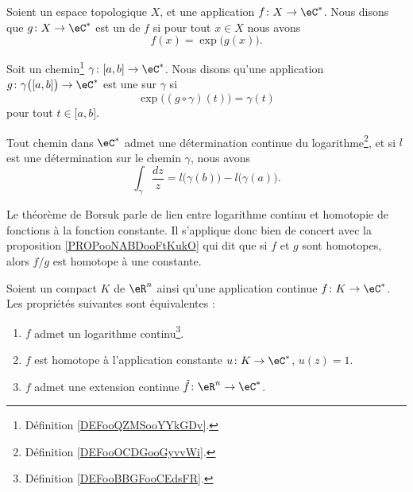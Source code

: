 \begin{definition}      \label{DEFooBBGFooCEdsFR}
	Soient un espace topologique \( X\), et une application \( f\colon X\to \eC^*\). Nous disons que \( g\colon X\to \eC^*\) est un  de \( f\) si pour tout \( x\in X\) nous avons
	\begin{equation}
		f(x)=\exp\big( g(x) \big).
	\end{equation}
\end{definition}

\begin{definition}     \label{DEFooOCDGooGyvvWi}
	Soit un chemin\footnote{Définition \ref{DEFooQZMSooYYkGDv}.} \( \gamma\colon \mathopen[ a , b \mathclose]\to \eC^*\). Nous disons qu'une application \( g\colon \gamma\big( \mathopen[ a , b \mathclose] \big)\to \eC^*\) est une  sur \( \gamma\) si
	\begin{equation}
		\exp\big( (g\circ\gamma)(t) \big)=\gamma(t)
	\end{equation}
	pour tout \( t\in \mathopen[ a , b \mathclose]\).
\end{definition}

\begin{theorem}     \label{THOooUPANooMiECqe}
	Tout chemin dans \( \eC^*\) admet une détermination continue du logarithme\footnote{Définition \ref{DEFooOCDGooGyvvWi}.}, et si \( l\) est une détermination sur le chemin \( \gamma\), nous avons
	\begin{equation}
		\int_{\gamma}\frac{ dz }{ z }=l\big( \gamma(b) \big)-l\big( \gamma(a) \big).
	\end{equation}
\end{theorem}

Le théorème de Borsuk parle de lien entre logarithme continu et homotopie de fonctions à la fonction constante. Il s'applique donc bien de concert avec la proposition \ref{PROPooNABDooFtKukO} qui dit que si \( f\) et \( g\) sont homotopes, alors \( f/g\) est homotope à une constante.

\begin{theorem}     \label{THOooTCUMooEByCKg}
	Soient un compact \( K\) de \( \eR^n\) ainsi qu'une application continue \( f\colon K\to \eC^*\). Les propriétés suivantes sont équivalentes :
	\begin{enumerate}
		\item   \label{ITEMooKZYDooKoEEbl}
		      \( f\) admet un logarithme continu\footnote{Définition \ref{DEFooBBGFooCEdsFR}.}.
		\item   \label{ITEMooXVNXooVAHklr}
		      \( f\) est homotope à l'application constante \( u\colon K\to \eC^*\), \( u(z)=1\).
		\item   \label{ITEMooQDHXooObjxLA}
		      \( f\) admet une extension continue \( \tilde f\colon \eR^n\to \eC^*\).
	\end{enumerate}
\end{theorem}

